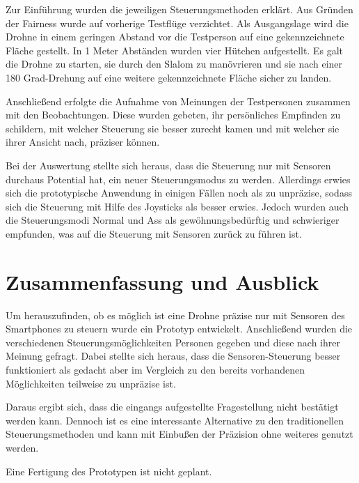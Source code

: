 \documentclass{article}
\begin{document}
Zur Einführung wurden die jeweiligen Steuerungsmethoden erklärt. Aus Gründen der Fairness wurde auf vorherige Testflüge verzichtet. Als Ausgangslage wird die Drohne in einem geringen Abstand vor die Testperson auf eine gekennzeichnete Fläche gestellt. In 1 Meter Abständen wurden vier Hütchen aufgestellt. Es galt die Drohne zu starten, sie durch den Slalom zu manövrieren und sie nach einer 180 Grad-Drehung auf eine weitere gekennzeichnete Fläche sicher zu landen.

Anschließend erfolgte die Aufnahme von Meinungen der Testpersonen zusammen mit den Beobachtungen. Diese wurden gebeten, ihr persönliches Empfinden zu schildern, mit welcher Steuerung sie besser zurecht kamen und mit welcher sie ihrer Ansicht nach, präziser können.

Bei der Auswertung stellte sich heraus, dass die Steuerung nur mit Sensoren durchaus Potential hat, ein neuer Steuerungsmodus zu werden. Allerdings erwies sich die prototypische Anwendung in einigen Fällen noch als zu unpräzise, sodass sich die Steuerung mit Hilfe des Joysticks als besser erwies. Jedoch wurden auch die Steuerungsmodi Normal und Ass als gewöhnungsbedürftig und schwieriger empfunden, was auf die Steuerung mit Sensoren zurück zu führen ist. 

\section{Zusammenfassung und Ausblick}
Um herauszufinden, ob es möglich ist eine Drohne präzise nur mit Sensoren des Smartphones zu steuern wurde ein Prototyp entwickelt. Anschließend wurden die verschiedenen Steuerungsmöglichkeiten Personen gegeben und diese nach ihrer Meinung gefragt. Dabei stellte sich heraus, dass die Sensoren-Steuerung besser funktioniert als gedacht aber im Vergleich zu den bereits vorhandenen Möglichkeiten teilweise zu unpräzise ist. 

Daraus ergibt sich, dass die eingangs aufgestellte Fragestellung nicht bestätigt werden kann. Dennoch ist es eine interessante Alternative zu den traditionellen Steuerungsmethoden und kann mit Einbußen der Präzision ohne weiteres genutzt werden.

Eine Fertigung des Prototypen ist nicht geplant.

{}

\end{document}
